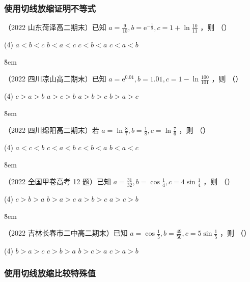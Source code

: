 \subsubsection{使用切线放缩证明不等式}

\begin{example}
    （2022 山东菏泽高二期末）已知 $a=\frac{9}{10}, b=\mathrm{e}^{-\frac{1}{9}}, c=1+\ln \frac{10}{11}$ ，则 （\quad）
    \begin{tasks}(4)
        \task $a<b<c$
        \task $b<a<c$
        \task $c<b<a$
        \task $c<a<b$
    \end{tasks}
\end{example}

\v{8em}

\begin{example}
    （2022 四川凉山高二期末）已知 $a=\mathrm{e}^{0.01}, b=1.01, c=1-\ln \frac{100}{101}$ ，则 （\quad）
    \begin{tasks}(4)
        \task $c>a>b$
        \task $a>c>b$
        \task $a>b>c$
        \task $b>a>c$
    \end{tasks}
\end{example}

\v{8em}

\begin{example}
    （2022 四川绵阳高二期末）若 $a=\ln \frac{8}{7}, b=\frac{1}{8}, c=\ln \frac{7}{6}$ ，则 （\quad）
    \begin{tasks}(4)
        \task $a<c<b$
        \task $c<a<b$
        \task $c<b<a$
        \task $b<a<c$
    \end{tasks}
\end{example}

\v{8em}

\begin{example}
    （2022 全国甲卷高考 12 题）已知 $a=\frac{31}{32}, b=\cos \frac{1}{4}, c=4 \sin \frac{1}{4}$ ，则 （\quad）
    \begin{tasks}(4)
        \task $c>b>a$
        \task $b>a>c$
        \task $a>b>c$
        \task $a>c>b$
    \end{tasks}
\end{example}

\v{8em}

\begin{example}
    （2022 吉林长春市二中高二期末）已知 $a=\cos \frac{1}{5}, b=\frac{49}{50}, c=5 \sin \frac{1}{5}$ ，则 （\quad）
    \begin{tasks}(4)
        \task $b>a>c$
        \task $c>b>a$
        \task $b>c>a$
        \task $c>a>b$
    \end{tasks}
\end{example}


\subsubsection{使用切线放缩比较特殊值}
